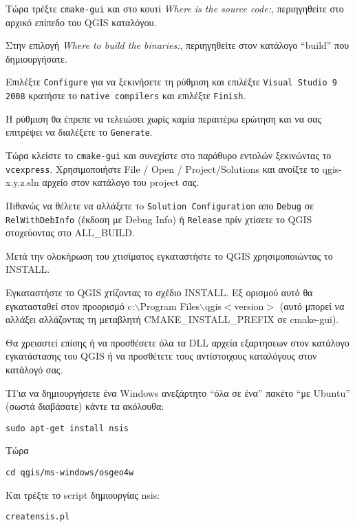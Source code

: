 Τώρα τρέξτε \texttt{cmake-gui} και στο κουτί \textit{Where is the source code:}, περιηγηθείτε στο αρχικό επίπεδο του QGIS καταλόγου.

Στην επιλογή \textit{Where to build the binaries:}, περιηγηθείτε στον κατάλογο “build” που δημιουργήσατε.

Επιλέξτε \texttt{Configure} για να ξεκινήσετε τη ρύθμιση και επιλέξτε \texttt{Visual Studio 9 2008}
κρατήστε το \texttt{native compilers} και επιλέξτε \texttt{Finish}.

Η ρύθμιση θα έπρεπε να τελειώσει χωρίς καμία περαιτέρω ερώτηση και να σας επιτρέψει να διαλέξετε το \texttt{Generate}.

Τώρα κλείστε το \texttt{cmake-gui} και συνεχίστε στο παράθυρο εντολών ξεκινώντας το
\texttt{vcexpress}.  Χρησιμοποιήστε  File / Open / Project/Solutions και ανοίξτε το qgis-x.y.z.sln αρχείο στον κατάλογο του project σας.

Πιθανώς να θέλετε να αλλάξετε τo \texttt{Solution Configuration} απο \texttt{Debug}
σε \texttt{RelWithDebInfo} (έκδοση με Debug Info) ή \texttt{Release} πρίν χτίσετε το QGIS στοχεύοντας στο ALL\_BUILD.

Μετά την ολοκήρωση του χτισίματος εγκαταστήστε το QGIS χρησιμοποιώντας το INSTALL.

Εγκαταστήστε το QGIS χτίζοντας το σχέδιο INSTALL. Εξ ορισμού αυτό θα εγκατασταθεί στον προορισμό 
c:$\backslash$Program Files$\backslash$qgis$<$version$>$ (αυτό μπορεί να αλλάξει αλλάζοντας τη μεταβλητή
CMAKE\_INSTALL\_PREFIX σε cmake-gui). 

Θα χρειαστεί επίσης ή να προσθέσετε όλα τα DLL αρχεία εξαρτησεων στον κατάλογο εγκατάστασης του QGIS ή να προσθέτετε τους αντίστοιχους καταλόγους στον κατάλογό σας.

TΓια να δημιουργήσετε ένα Windows ανεξάρτητο “όλα σε ένα” πακέτο “με Ubuntu” (σωστά διαβάσατε) κάντε τα ακόλουθα:

\begin{verbatim}
sudo apt-get install nsis
\end{verbatim}

Tώρα 

\begin{verbatim}
cd qgis/ms-windows/osgeo4w
\end{verbatim}

Και τρέξτε το script  δημιουργίας nsis:

\begin{verbatim}
creatensis.pl
\end{verbatim}

